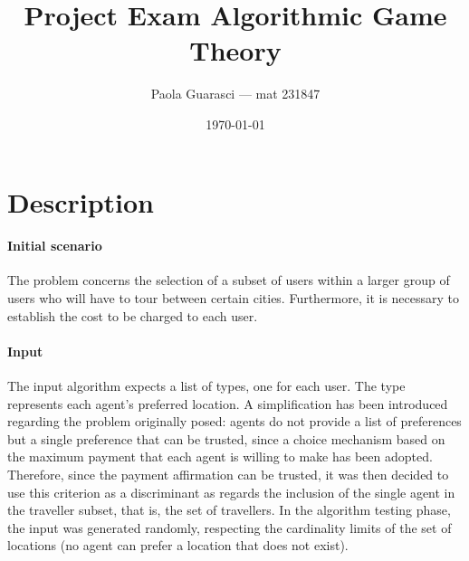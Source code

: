 \documentclass{article}
\title{Project Exam Algorithmic Game Theory}
\author{Paola Guarasci --- mat 231847}
\date{\today}
\begin{document}
\maketitle


\section*{Description}
\paragraph*{Initial scenario}
The problem concerns the selection of a subset of users within a larger group of users who will have to tour between certain cities. Furthermore, it is necessary to establish the cost to be charged to each user.
\paragraph*{Input}
The input algorithm expects a list of types, one for each user. The type represents each agent's preferred location. A simplification has been introduced regarding the problem originally posed: agents do not provide a list of preferences but a single preference that can be trusted, since a choice mechanism based on the maximum payment that each agent is willing to make has been adopted. Therefore, since the payment affirmation can be trusted, it was then decided to use this criterion as a discriminant as regards the inclusion of the single agent in the traveller subset, that is, the set of travellers.
In the algorithm testing phase, the input was generated randomly, respecting the cardinality limits of the set of locations (no agent can prefer a location that does not exist).
\end{document}
